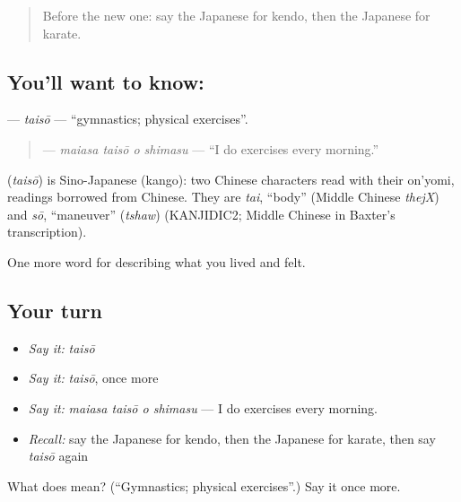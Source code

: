 \begin{quote}
Before the new one: say the Japanese for kendo, then the Japanese for karate.
\end{quote}

\subsection*{You'll want to know: }
\textbf{} — \emph{taisō} — \textquotedblleft{}gymnastics; physical exercises\textquotedblright{}.

\begin{quote}
\textbf{  } — \emph{maiasa taisō o shimasu} — \textquotedblleft{}I do exercises every morning.\textquotedblright{}
\end{quote}

\begin{cousinweb}
\textbf{} (\emph{taisō}) is Sino-Japanese (kango): two Chinese characters read with their on'yomi, readings borrowed from Chinese. They are \emph{tai}, \textquotedblleft{}body\textquotedblright{} (Middle Chinese \emph{thejX}) and \emph{sō}, \textquotedblleft{}maneuver\textquotedblright{} (\emph{tshaw}) (KANJIDIC2; Middle Chinese in Baxter's transcription).
\end{cousinweb}

\begin{grammarlens}[title={What you've built}]
One more word for describing what you lived and felt.
\end{grammarlens}

\subsection*{Your turn}
\begin{itemize}
\raggedright
  \item \emph{Say it:} \emph{taisō}
  \item \emph{Say it:} \emph{taisō}, once more
  \item \emph{Say it:} \emph{maiasa taisō o shimasu} — I do exercises every morning.
  \item \emph{Recall:} say the Japanese for kendo, then the Japanese for karate, then say \emph{taisō} again
\end{itemize}

\begin{tcolorbox}[breakable,colback=teal!4,colframe=teal!35!black,title={Before you move on}]
What does  mean? (\textquotedblleft{}Gymnastics; physical exercises\textquotedblright{}.) Say it once more.
\end{tcolorbox}
